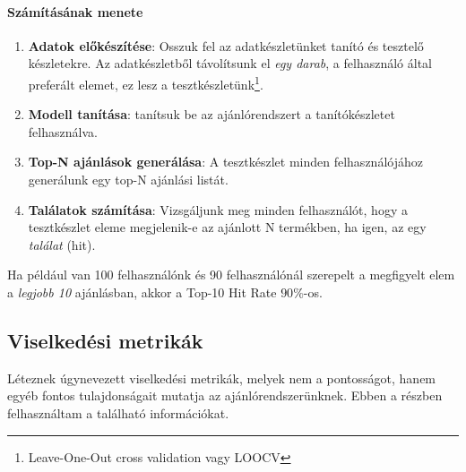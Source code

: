 \documentclass[
]{thesis-ekf}
\theoremstyle{definition}
\theoremstyle{remark}
\begin{document}
\paragraph{Számításának menete}
\begin{enumerate}
	\item \textbf{Adatok előkészítése}: Osszuk fel az adatkészletünket tanító és tesztelő készletekre. Az adatkészletből távolítsunk el \emph{egy darab}, a felhasználó által preferált elemet, ez lesz a tesztkészletünk\footnote{Leave-One-Out cross validation vagy LOOCV}.
	\item \textbf{Modell tanítása}: tanítsuk be az ajánlórendszert a tanítókészletet felhasználva.
	\item \textbf{Top-N ajánlások generálása}: A tesztkészlet minden felhasználójához generálunk egy top-N ajánlási listát.
	\item \textbf{Találatok számítása}: Vizsgáljunk meg minden felhasználót, hogy a tesztkészlet eleme megjelenik-e az ajánlott N termékben, ha igen, az egy \emph{találat} (hit).
\end{enumerate}\cite{article-evaulating-a-real-life-recommender-system}

Ha például van 100 felhasználónk és 90 felhasználónál szerepelt a  megfigyelt elem a \emph{legjobb 10} ajánlásban, akkor a Top-10 Hit Rate $90\%$-os.

\subsection{Viselkedési metrikák}
\label{subsec-viselkedesi-metrikak}
Léteznek úgynevezett viselkedési metrikák, melyek nem a pontosságot, hanem egyéb fontos tulajdonságait mutatja az ajánlórendszerünknek. Ebben a részben felhasználtam a \cite{10-metrics-to-evaluate-rec-and-ranking-systems} található információkat.
\end{document}
